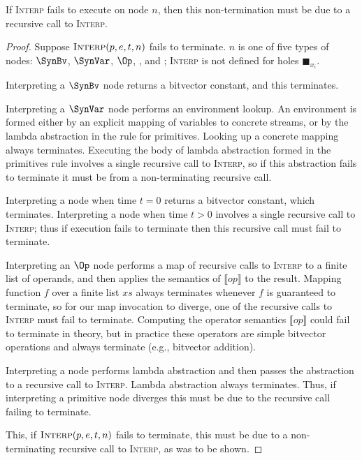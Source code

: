 
\begin{lemma}
    \label{lemma:non-termination-of-rule-implies-recursive-call}
    If \textsc{Interp} fails to execute
    on node $n$, then this non-termination
    must be due to a recursive call to 
    \textsc{Interp}.
\end{lemma}
\begin{proof}
Suppose $\textsc{Interp}(p,e,t,n)$
    fails to terminate.
$n$ is one of five types of nodes:
    $\SynBv$,
    $\SynVar$,
    $\Op$, 
    \IRReg,
    and \IRPrim;
    \textsc{Interp} is not defined for holes
    $\blacksquare_{x_i}$.
    
Interpreting a $\SynBv$ node
    returns a bitvector constant,
    and this terminates.

Interpreting a $\SynVar$ node
    performs an environment
    lookup.
An environment is formed either by an
    explicit mapping of
    variables to concrete streams,
    or by the lambda abstraction
    in the rule for primitives.
Looking up a concrete mapping always
    terminates.
Executing the body of lambda abstraction
    formed in the primitives rule
    involves a single recursive call to \textsc{Interp},
    so if this abstraction fails to terminate
    it must be from a non-terminating recursive call.
    
Interpreting a \IRReg{} node when time $t=0$
    returns a bitvector constant, which terminates.
Interpreting a \IRReg{} node when time $t > 0$
    involves a single recursive call to \textsc{Interp};
    thus if execution fails to terminate then this
    recursive call must fail to terminate.

Interpreting an $\Op$ node performs a
    map of recursive calls to \textsc{Interp}
    to a finite list of operands,
    and then applies the semantics 
    of $\llbracket op \rrbracket$
    to the result.
Mapping function $f$ over a finite list $xs$ always
    terminates whenever $f$ is guaranteed to
    terminate, so for our map invocation to
    diverge, one of the recursive
    calls to \textsc{Interp}
    must fail to terminate.
Computing the operator semantics
    $\llbracket op \rrbracket$
    could fail to terminate in theory,
    but in practice these operators are
    simple bitvector operations
    and always terminate (e.g., bitvector addition).
    
Interpreting a \IRPrim{} node
    performs lambda abstraction and then
    passes the abstraction to a recursive
    call to \textsc{Interp}.
Lambda abstraction always terminates.
Thus, if interpreting a primitive node
    diverges this must be due to the
    recursive call failing to terminate.

This, if $\textsc{Interp}(p,e,t,n)$ fails to
    terminate, this must be due to a non-terminating recursive
    call to \textsc{Interp}, as was to be shown.
\end{proof}

